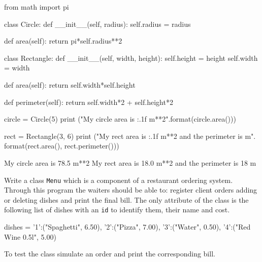 \cprotEnv\begin{solution}
\begin{ipython}
from math import pi

class Circle:
    def __init__(self, radius):
        self.radius = radius

    def area(self):
        return pi*self.radius**2

class Rectangle:
    def __init__(self, width, height):
        self.height = height
        self.width = width

    def area(self):
        return self.width*self.height

    def perimeter(self):
        return self.width*2 + self.height*2

circle = Circle(5)
print ("My circle area is {:.1f} m**2".format(circle.area()))

rect = Rectangle(3, 6)
print ("My rect area is {:.1f} m**2 and the perimeter is {} m". \\
        format(rect.area(), rect.perimeter()))
\end{ipython}
\begin{ioutput}
My circle area is 78.5 m**2
My rect area is 18.0 m**2 and the perimeter is 18 m
\end{ioutput}
\end{solution}

\cprotEnv\begin{question}
Write a class \texttt{Menu} which is a component of a restaurant ordering system. Through this program the waiters should be able to: register client orders adding or deleting dishes and print the final bill.
The only attribute of the class is the following list of dishes with an \texttt{id} to identify them, their name and cost.

\begin{ipython}
dishes = {'1':("Spaghetti", 6.50), '2':("Pizza", 7.00), '3':("Water", 0.50),
                       '4':("Red Wine 0.5l", 5.00)}
\end{ipython}
\noindent
To test the class simulate an order and print the corresponding bill.
\end{question}

